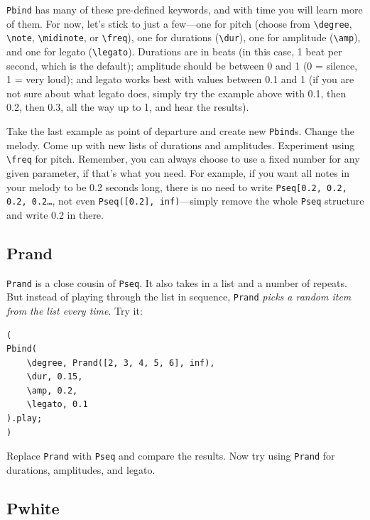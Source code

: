\texttt{Pbind} has many of these pre-defined keywords, and with time you will learn more of them. For now, let's stick to just a few---one for pitch (choose from \texttt{\textbackslash degree}, \texttt{\textbackslash note}, \texttt{\textbackslash midinote}, or \texttt{\textbackslash freq}), one for durations (\texttt{\textbackslash dur}), one for amplitude (\texttt{\textbackslash amp}), and one for legato  (\texttt{\textbackslash legato}). Durations are in beats (in this case, 1 beat per second, which is the default); amplitude should be between 0 and 1 (0 = silence, 1 = very loud); and legato works best with values between 0.1 and 1 (if you are not sure about what legato does, simply try the example above with 0.1, then 0.2, then 0.3, all the way up to 1, and hear the results).

Take the last example as point of departure and create new \texttt{Pbind}s. Change the melody. Come up with new lists of durations and amplitudes. Experiment using \texttt{\textbackslash freq} for pitch. Remember, you can always choose to use a fixed number for any given parameter, if that's what you need. For example, if you want all notes in your melody to be 0.2 seconds long, there is no need to write \texttt{Pseq[0.2, 0.2, 0.2, 0.2\dots}, not even \texttt{Pseq([0.2], inf)}---simply remove the whole \texttt{Pseq} structure and write 0.2 in there.

\subsection{Prand}

\texttt{Prand} is a close cousin of \texttt{Pseq}. It also takes in a list and a number of repeats. But instead of playing through the list in sequence, \texttt{Prand} \emph{picks a random item from the list every time}. Try it:

 
\begin{lstlisting}[style=SuperCollider-IDE, basicstyle=\scttfamily\footnotesize]
(
Pbind(
	\degree, Prand([2, 3, 4, 5, 6], inf),
	\dur, 0.15,
	\amp, 0.2,
	\legato, 0.1
).play;
)
\end{lstlisting}
 

Replace \texttt{Prand} with \texttt{Pseq} and compare the results. Now try using \texttt{Prand} for durations, amplitudes, and legato.

\subsection{Pwhite}

